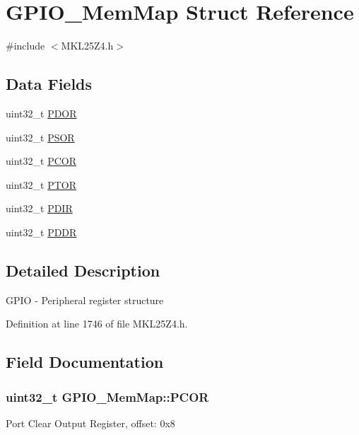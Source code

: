 \hypertarget{struct_g_p_i_o___mem_map}{}\section{G\+P\+I\+O\+\_\+\+Mem\+Map Struct Reference}
\label{struct_g_p_i_o___mem_map}


{\ttfamily \#include $<$M\+K\+L25\+Z4.\+h$>$}

\subsection*{Data Fields}
\begin{DoxyCompactItemize}
\item 
uint32\+\_\+t \hyperlink{struct_g_p_i_o___mem_map_aaf4f486952b9b4680e270ce6266122fd}{P\+D\+OR}
\item 
uint32\+\_\+t \hyperlink{struct_g_p_i_o___mem_map_a14833f065ec123137ccce5ab873b5879}{P\+S\+OR}
\item 
uint32\+\_\+t \hyperlink{struct_g_p_i_o___mem_map_a996f6a159415a5c0d0683346e950e7fb}{P\+C\+OR}
\item 
uint32\+\_\+t \hyperlink{struct_g_p_i_o___mem_map_a03faa882b5f4554ff4c11954c2d8759b}{P\+T\+OR}
\item 
uint32\+\_\+t \hyperlink{struct_g_p_i_o___mem_map_a01933bea5d005bf126ea2e0345518763}{P\+D\+IR}
\item 
uint32\+\_\+t \hyperlink{struct_g_p_i_o___mem_map_a49dfaa95d08fa9178dd7f098c87f562d}{P\+D\+DR}
\end{DoxyCompactItemize}


\subsection{Detailed Description}
G\+P\+IO -\/ Peripheral register structure 

Definition at line 1746 of file M\+K\+L25\+Z4.\+h.



\subsection{Field Documentation}
\subsubsection[{\texorpdfstring{P\+C\+OR}{PCOR}}]{\setlength{\rightskip}{0pt plus 5cm}uint32\+\_\+t G\+P\+I\+O\+\_\+\+Mem\+Map\+::\+P\+C\+OR}\hypertarget{struct_g_p_i_o___mem_map_a996f6a159415a5c0d0683346e950e7fb}{}\label{struct_g_p_i_o___mem_map_a996f6a159415a5c0d0683346e950e7fb}
Port Clear Output Register, offset\+: 0x8 


